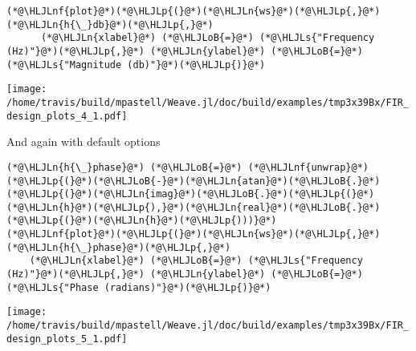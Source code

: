 \documentclass[12pt,a4paper]{article}
\newcommand{\HLJLn}[1]{#1}
\newcommand{\HLJLnf}[1]{\textcolor[RGB]{66,102,213}{#1}}
\newcommand{\HLJLs}[1]{\textcolor[RGB]{201,61,57}{#1}}
\newcommand{\HLJLoB}[1]{\textcolor[RGB]{102,102,102}{\textbf{#1}}}
\newcommand{\HLJLp}[1]{#1}
\begin{document}
\begin{lstlisting}
(*@\HLJLnf{plot}@*)(*@\HLJLp{(}@*)(*@\HLJLn{ws}@*)(*@\HLJLp{,}@*) (*@\HLJLn{h{\_}db}@*)(*@\HLJLp{,}@*)
      (*@\HLJLn{xlabel}@*) (*@\HLJLoB{=}@*) (*@\HLJLs{"Frequency (Hz)"}@*)(*@\HLJLp{,}@*) (*@\HLJLn{ylabel}@*) (*@\HLJLoB{=}@*) (*@\HLJLs{"Magnitude (db)"}@*)(*@\HLJLp{)}@*)
\end{lstlisting}

\texttt{[image: /home/travis/build/mpastell/Weave.jl/doc/build/examples/tmp3x39Bx/FIR\_design\_plots\_4\_1.pdf]}

And again with default options


\begin{lstlisting}
(*@\HLJLn{h{\_}phase}@*) (*@\HLJLoB{=}@*) (*@\HLJLnf{unwrap}@*)(*@\HLJLp{(}@*)(*@\HLJLoB{-}@*)(*@\HLJLn{atan}@*)(*@\HLJLoB{.}@*)(*@\HLJLp{(}@*)(*@\HLJLn{imag}@*)(*@\HLJLoB{.}@*)(*@\HLJLp{(}@*)(*@\HLJLn{h}@*)(*@\HLJLp{),}@*)(*@\HLJLn{real}@*)(*@\HLJLoB{.}@*)(*@\HLJLp{(}@*)(*@\HLJLn{h}@*)(*@\HLJLp{)))}@*)
(*@\HLJLnf{plot}@*)(*@\HLJLp{(}@*)(*@\HLJLn{ws}@*)(*@\HLJLp{,}@*) (*@\HLJLn{h{\_}phase}@*)(*@\HLJLp{,}@*)
    (*@\HLJLn{xlabel}@*) (*@\HLJLoB{=}@*) (*@\HLJLs{"Frequency (Hz)"}@*)(*@\HLJLp{,}@*) (*@\HLJLn{ylabel}@*) (*@\HLJLoB{=}@*) (*@\HLJLs{"Phase (radians)"}@*)(*@\HLJLp{)}@*)
\end{lstlisting}

\texttt{[image: /home/travis/build/mpastell/Weave.jl/doc/build/examples/tmp3x39Bx/FIR\_design\_plots\_5\_1.pdf]}
\end{document}
